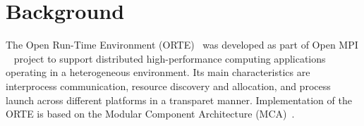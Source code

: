 \chapter{Background}
\label{sec:Background}

The Open Run-Time Environment (ORTE)~\cite{Castain2008153} was developed as part of Open MPI
~\cite{gabriel04:_open_mpi} project to support distributed high-performance computing
applications operating in a heterogeneous environment. Its main 
characteristics are interprocess communication, resource discovery and
allocation, and process launch across different platforms in a transparet manner.
Implementation of the ORTE is based on the Modular Component Architecture 
(MCA)~\cite{gabriel04:_open_mpi}.

